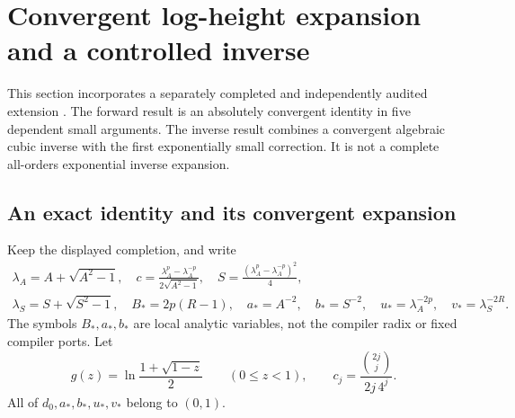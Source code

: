 \section{Convergent log-height expansion and a controlled inverse}
\label{sec:expansion}
This section incorporates a separately completed and independently
audited extension \cite{expansion,expansionaudit}. The forward result
is an absolutely convergent identity in five dependent small arguments.
The inverse result combines a convergent algebraic cubic inverse with
the first exponentially small correction. It is not a complete
all-orders exponential inverse expansion.

\subsection{An exact identity and its convergent expansion}
Keep the displayed completion, and write
\begin{gather*}
 \lambda_A=A+\sqrt{A^2-1},\quad
 c=\frac{\lambda_A^p-\lambda_A^{-p}}{2\sqrt{A^2-1}},\quad
 S=\frac{(\lambda_A^p-\lambda_A^{-p})^2}{4},\\
 \lambda_S=S+\sqrt{S^2-1},\quad
 B_*=2p(R-1),\quad a_*=A^{-2},\quad b_*=S^{-2},\quad
 u_*=\lambda_A^{-2p},\quad v_*=\lambda_S^{-2R}.
\end{gather*}
The symbols $B_*,a_*,b_*$ are local analytic variables, not the
compiler radix or fixed compiler ports. Let
\[
 g(z)=\ln\frac{1+\sqrt{1-z}}2\qquad(0\le z<1),\qquad
 c_j=\frac{\binom{2j}{j}}{2j\,4^j}.
\]
All of $d_0,a_*,b_*,u_*,v_*$ belong to $(0,1)$.

